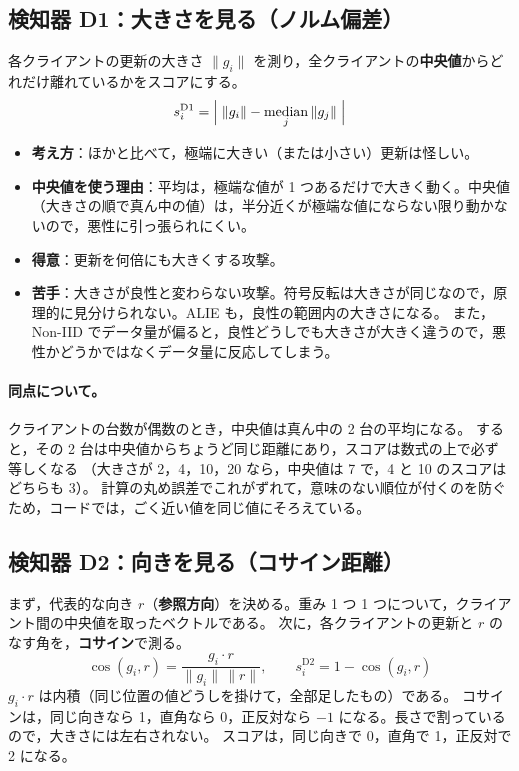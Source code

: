 \documentclass[a4j, dvipdfmx]{jsarticle}  %
\begin{document}
\subsection{検知器 D1：大きさを見る（ノルム偏差）}

各クライアントの更新の大きさ $\|g_i\|$ を測り，全クライアントの\textbf{中央値}からどれだけ離れているかをスコアにする。
\begin{equation}
  s_i^{\mathrm{D1}} = \Bigl|\; \|g_i\| - \operatorname*{median}_j \|g_j\| \;\Bigr|
\end{equation}

\begin{itemize}
  \item \textbf{考え方}：ほかと比べて，極端に大きい（または小さい）更新は怪しい。
  \item \textbf{中央値を使う理由}：平均は，極端な値が 1 つあるだけで大きく動く。中央値（大きさの順で真ん中の値）は，半分近くが極端な値にならない限り動かないので，悪性に引っ張られにくい。
  \item \textbf{得意}：更新を何倍にも大きくする攻撃。
  \item \textbf{苦手}：大きさが良性と変わらない攻撃。符号反転は大きさが同じなので，原理的に見分けられない。ALIE も，良性の範囲内の大きさになる。
        また，Non-IID でデータ量が偏ると，良性どうしでも大きさが大きく違うので，悪性かどうかではなくデータ量に反応してしまう。
\end{itemize}

\paragraph{同点について。}
クライアントの台数が偶数のとき，中央値は真ん中の 2 台の平均になる。
すると，その 2 台は中央値からちょうど同じ距離にあり，スコアは数式の上で必ず等しくなる
（大きさが 2，4，10，20 なら，中央値は 7 で，4 と 10 のスコアはどちらも 3）。
計算の丸め誤差でこれがずれて，意味のない順位が付くのを防ぐため，コードでは，ごく近い値を同じ値にそろえている。

\subsection{検知器 D2：向きを見る（コサイン距離）}

まず，代表的な向き $r$（\textbf{参照方向}）を決める。重み 1 つ 1 つについて，クライアント間の中央値を取ったベクトルである。
次に，各クライアントの更新と $r$ のなす角を，\textbf{コサイン}で測る。
\begin{equation}
  \cos(g_i, r) = \frac{g_i \cdot r}{\|g_i\|\,\|r\|}, \qquad
  s_i^{\mathrm{D2}} = 1 - \cos(g_i, r)
\end{equation}
$g_i \cdot r$ は内積（同じ位置の値どうしを掛けて，全部足したもの）である。
コサインは，同じ向きなら 1，直角なら 0，正反対なら $-1$ になる。長さで割っているので，大きさには左右されない。
スコアは，同じ向きで 0，直角で 1，正反対で 2 になる。
\end{document}
